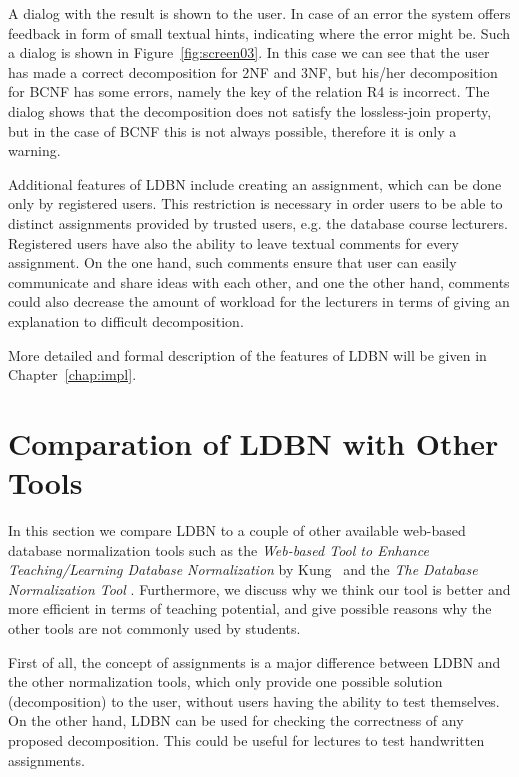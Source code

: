 A dialog with the result is shown to the user. In case of an error the system offers
feedback in form of small textual hints, indicating
where the error might be. Such a dialog is shown in Figure~\ref{fig:screen03}. In this case
we can see that the user has made a correct decomposition for 2NF and 3NF,
but his/her decomposition for BCNF has some errors, namely the key of the relation R4 is
incorrect. The dialog shows that the decomposition does not 
satisfy the lossless-join property, but in the case of BCNF this
is not always possible, therefore it is only a warning. 

Additional features of LDBN include creating an assignment, which can be done 
only by registered users. This restriction is necessary in order users to be able 
to distinct assignments provided by trusted users, e.g. the database course
lecturers. Registered users have also the ability to leave textual comments 
for every assignment. On the one hand, such
comments ensure that user can easily communicate and share ideas
with each other, and one the other hand, comments could also decrease the amount of workload
for the lecturers in terms of giving an explanation to difficult decomposition.

More detailed and formal description of the features of LDBN will be given in
Chapter~\ref{chap:impl}. 

\section{Comparation of LDBN with Other Tools}
\label{sec:comparation}
In this section we compare LDBN to a couple of other 
available web-based database normalization tools 
such as the \textit{Web-based Tool to Enhance Teaching/Learning Database 
Normalization} by Kung~\cite{p8} and the \textit{The Database Normalization Tool}
\cite{w1}. Furthermore, we discuss why we think our tool is better 
and more efficient
in terms of teaching potential, and give possible reasons why the 
other tools are not commonly used by students.

First of all, the concept of assignments is a major
difference between LDBN and the other normalization tools, 
which only provide 
one possible solution (decomposition) to the user, without users having the ability to test 
themselves. On the other hand, LDBN can be used for checking the correctness of any
proposed decomposition. This could be useful for lectures to test handwritten assignments. 

